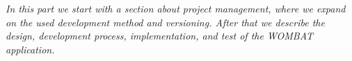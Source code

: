 \textit{In this part we start with a section about project management, where we expand on the used development method and versioning. After that we describe the design, development process, implementation, and test of the WOMBAT application.}